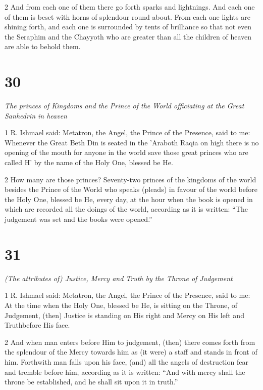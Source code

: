 \par 2 And from each one of them there go forth sparks and lightnings. And each one of them is beset with horns of splendour round about. From each one lights are shining forth, and each one is surrounded by tents of brilliance so that not even the Seraphim and the Chayyoth who are greater than all the children of heaven are able to behold them. 

\chapter{30}

\par \textit{The princes of Kingdoms and the Prince of the World officiating at the Great Sanhedrin in heaven}

\par 1 R. Ishmael said: Metatron, the Angel, the Prince of the Presence, said to me: Whenever the Great Beth Din is seated in the 'Araboth Raqia on high there is no opening of the mouth for anyone in the world save those great princes who are called H' by the name of the Holy One, blessed be He. 

\par 2 How many are those princes? Seventy-two princes of the kingdoms of the world besides the Prince of the World who speaks (pleads) in favour of the world before the Holy One, blessed be He, every day, at the hour when the book is opened in which are recorded all the doings of the world, according as it is written: “The judgement was set and the books were opened.”

\chapter{31}

\par \textit{(The attributes of) Justice, Mercy and Truth by the Throne of Judgement}

\par 1 R. Ishmael said: Metatron, the Angel, the Prince of the Presence, said to me: At the time when the Holy One, blessed be He, is sitting on the Throne, of Judgement, (then) Justice is standing on His right and Mercy on His left and Truthbefore His face. 

\par 2 And when man enters before Him to judgement, (then) there comes forth from the splendour of the Mercy towards him as (it were) a staff and stands in front of him. Forthwith man falls upon his face, (and) all the angels of destruction fear and tremble before him, according as it is written: “And with mercy shall the throne be established, and he shall sit upon it in truth.” 

